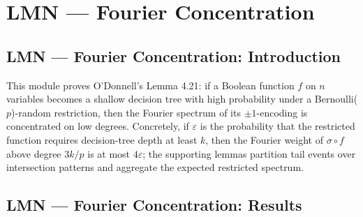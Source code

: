 \section{LMN --- Fourier Concentration}
\subsection*{LMN --- Fourier Concentration: Introduction}

This module proves O'Donnell's Lemma 4.21: if a Boolean function $f$ on $n$ variables
becomes a shallow decision tree with high probability under a Bernoulli($p$)-random
restriction, then the Fourier spectrum of its $\pm1$-encoding is concentrated on low
degrees. Concretely, if $\varepsilon$ is the probability that the restricted function
requires decision-tree depth at least $k$, then the Fourier weight of $\sigma\circ f$
above degree $3k/p$ is at most $4\varepsilon$; the supporting lemmas partition tail
events over intersection patterns and aggregate the expected restricted spectrum.

\subsection*{LMN --- Fourier Concentration: Results}


